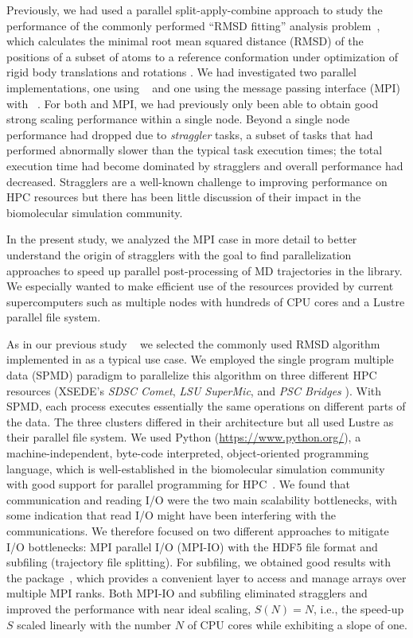Previously, we had used a parallel split-apply-combine  approach to study the performance of the commonly performed ``RMSD fitting'' analysis problem~\cite{Khoshlessan:2017ab, ICCP-2018}, which calculates the minimal root mean squared distance (RMSD) of the positions of a subset of atoms to a reference conformation under optimization of rigid body translations and rotations \cite{Liu:2010kx, Lea96, Mura:2014kx}.
We had investigated two parallel implementations, one using ~\cite{Rocklin:2015aa} and one using the message passing interface (MPI) with ~\cite{Dalcin:2011aa, Dalcin:2005aa}. 
For both  and MPI, we had previously only been able to obtain good strong scaling performance within a single node.
Beyond a single node performance had dropped due to \emph{straggler} tasks, a subset of tasks that had performed abnormally slower than the typical task execution times; the total execution time had become dominated by stragglers and overall performance had decreased.
Stragglers are a well-known challenge to improving performance on HPC resources \cite{Garraghan2016} but there has been little discussion of their impact in the biomolecular simulation community.

In the present study, we analyzed the MPI case in more detail to better understand the origin of stragglers with the goal to find  parallelization approaches to speed up parallel post-processing of MD trajectories in the  library.
We especially wanted to make efficient use of the resources provided by current supercomputers such as multiple nodes with hundreds of CPU cores and a Lustre parallel file system.

As in our previous study ~\cite{Khoshlessan:2017ab} we selected the commonly used RMSD algorithm implemented in  as a typical use case.
We employed the single program multiple data (SPMD) paradigm to parallelize this algorithm on three different HPC resources (XSEDE's \emph{SDSC Comet}, \emph{LSU SuperMic}, and \emph{PSC Bridges} \cite{xsede}).
With SPMD, each process executes essentially the same operations on different parts of the data.
The three clusters differed in their architecture but all used Lustre as their parallel file system.
We used Python (\url{https://www.python.org/}), a machine-independent, byte-code interpreted, object-oriented programming language, which is well-established in the biomolecular simulation community with good support for parallel programming for HPC~\cite{Dalcin:2011aa, GAiN}. 
We found that communication and reading I/O were the two main scalability bottlenecks, with some indication that read I/O might have been interfering with the communications.
We therefore focused on two different approaches to mitigate I/O bottlenecks: MPI parallel I/O (MPI-IO) with the HDF5 file format and subfiling (trajectory file splitting).
For subfiling, we obtained good results with the  package~\cite{GA, GAiN}, which provides a convenient layer to access and manage arrays over multiple MPI ranks.
Both MPI-IO and subfiling eliminated stragglers and improved the performance with near ideal scaling, $S(N) = N$, i.e., the speed-up $S$ scaled linearly with the number $N$ of CPU cores while exhibiting a slope of one.

